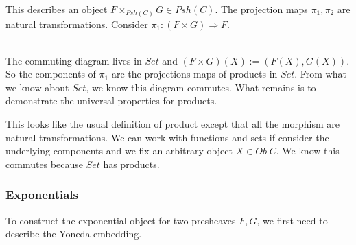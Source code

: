 \documentclass{article}
\begin{document}
    \newpage
This describes an object $F \times_{Psh(C)} G \in Psh(C)$. The projection maps $\pi_1, \pi_2$ are natural transformations. Consider $\pi_1 : (F \times G) \Rightarrow F$.
\begin{figure}[!h]
\centering
\end{figure}\\
The commuting diagram lives in $Set$ and $(F \times G)(X) := (F(X), G(X))$. So the components of $\pi_1$ are the projections maps of products in $Set$. From what we know about $Set$, we know this diagram commutes. What remains is to demonstrate the universal properties for products.

\begin{figure}[!h]
    \centering
\end{figure}

This looks like the usual definition of product except that all the morphism are natural transformations. We can work with functions and sets if consider the underlying components and we fix an arbitrary object $X \in Ob \;C$. We know this commutes because $Set$ has products.


\begin{figure}[!h]
    \centering
\end{figure}

\subsubsection{Exponentials}

To construct the exponential object for two presheaves $F,G$, we first need to describe the Yoneda embedding.
\end{document}
